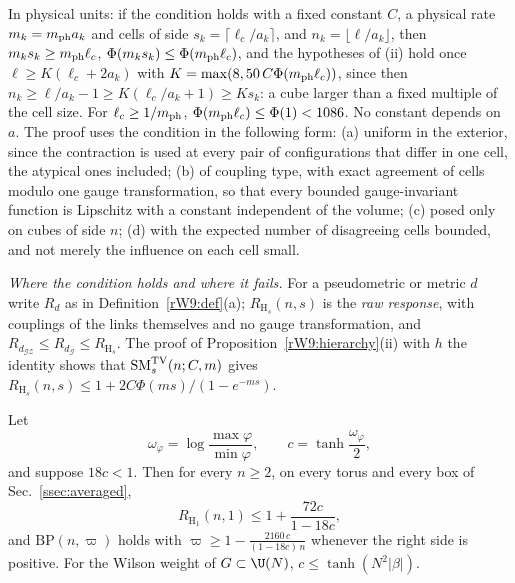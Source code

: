 In physical units: if the condition holds with a fixed constant $C$, a
physical rate $m_k=m_{\rm ph} a_k$ and cells of side $s_k=\lceil\ell_c/a_k\rceil$,
and $n_k=\lfloor\ell/a_k\rfloor$, then $m_ks_k\ge m_{\rm ph}\ell_c$, $\Phi(m_ks_k)\le
\Phi(m_{\rm ph}\ell_c)$, and the hypotheses of (ii) hold once
$\ell\ge K(\ell_c+2a_k)$ with $K=\max(8,50\,C\Phi(m_{\rm ph}\ell_c))$, since then
$n_k\ge\ell/a_k-1\ge K(\ell_c/a_k+1)\ge Ks_k$: a cube larger than a
fixed multiple of the cell size. For $\ell_c\ge1/m_{\rm ph}$,
$\Phi(m_{\rm ph}\ell_c)\le\Phi(1)<1086$. No constant depends on $a$. The proof uses
the condition in the following form: (a) uniform in the exterior, since the
contraction is used at every pair of configurations that differ in one cell,
the atypical ones included; (b) of coupling type, with exact agreement of
cells modulo one gauge transformation, so that every bounded gauge-invariant
function is Lipschitz with a constant independent of the volume; (c) posed
only on cubes of side $n$; (d) with the expected number of disagreeing cells
bounded, and not merely the influence on each cell small.

\emph{Where the condition holds and where it fails.} For a pseudometric or
metric $d$ write $R_d$ as in Definition~\ref{rW9:def}(a); $R_{\mathrm H_s}
(n,s)$ is the \emph{raw response}, with couplings of the links themselves and
no gauge transformation, and $R_{d_{\mathcal{GZ}}}\le R_{d_{\mathcal G}}\le
R_{\mathrm H_s}$. The proof of Proposition~\ref{rW9:hierarchy}(ii) with $h$
the identity shows that $\mathrm{SM}^{\rm TV}_s(n;C,m)$ gives $R_{\mathrm H_s}
(n,s)\le1+2C\Phi(ms)/(1-e^{-ms})$.

\begin{proposition}\label{rW9:strong}
Let
\[
\omega_\varphi=\log\frac{\max\varphi}{\min\varphi},\qquad
c=\tanh\frac{\omega_\varphi}2,
\]
and suppose $18c<1$. Then for every $n\ge2$, on every torus and every
box of Sec.~\ref{ssec:averaged},
\[
R_{\mathrm H_1}(n,1)\le1+\frac{72c}{1-18c},
\]
and $\mathrm{BP}(n,\varpi)$ holds with $\varpi\ge1-\frac{2160\,c}{(1-18c)\,n}$
whenever the right side is positive. For the Wilson weight of $G\subset\U(N)$,
$c\le\tanh(N^2\lvert\beta\rvert)$.
\end{proposition}

